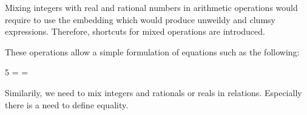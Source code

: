 \documentclass[12pt]{article}
\begin{document}
Mixing integers with real and rational numbers in arithmetic
operations would require to use the embedding which would produce
unweildy and clumsy expressions. Therefore, shortcuts for mixed
operations are introduced.
%

These operations allow a simple formulation of equations such as the
following:

\begin{zed}
 5 \azmult \atwo = \aten {} = \aten
\end{zed}
%
Similarily, we need to mix integers and rationals or reals in
relations. Especially there is a need to define equality.
\end{document}
